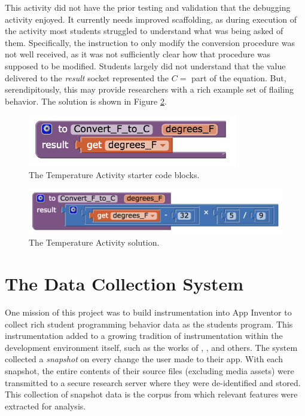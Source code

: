 This activity did not have the prior testing and validation that the debugging activity enjoyed. It currently needs improved scaffolding, as during execution of the activity most students struggled to understand what was being asked of them. Specifically, the instruction to only modify the conversion procedure was not well received, as it was not sufficiently clear how that procedure was supposed to be modified. Students largely did not understand that the value delivered to the \emph{result} socket represented the $C=$ part of the equation. But, serendipitously, this may provide researchers with a rich example set of flailing behavior. The solution is shown in Figure \ref{fig:temperature1}.

\begin{figure}
  \centering
      \includegraphics[width=3.6in]{images/temperatureActivity/temperature0start}
  \caption[The Temperature Activity starter code blocks]{The Temperature Activity starter code blocks.}
  \label{fig:temperature0}
\end{figure}

\begin{figure}
  \centering
      \includegraphics[width=\textwidth]{images/temperatureActivity/temperature1solution}
  \caption[The Temperature Activity solution]{The Temperature Activity solution.}
  \label{fig:temperature1}
\end{figure}



\section{The Data Collection System}
One mission of this project was to build instrumentation into App Inventor to collect rich student programming behavior data as the students program. This instrumentation added to a growing tradition of instrumentation within the development environment itself, such as the works of \citet{berland-2013}, \citet{lipman-phd}, and others. The system collected a \emph{snapshot} on every change the user made to their app. With each snapshot, the entire contents of their source files (excluding media assets) were transmitted to a secure research server where they were de-identified and stored. This collection of snapshot data is the corpus from which relevant features were extracted for analysis.

